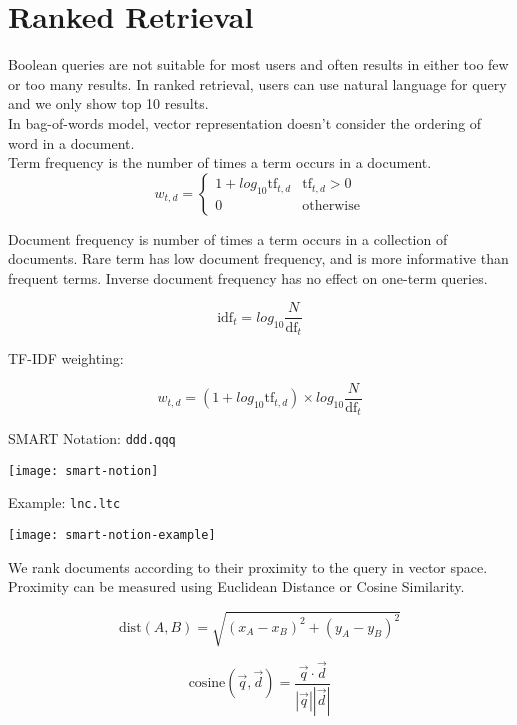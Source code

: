 \chapter{Ranked Retrieval}
\begin{multicols*}{2}

\noindent Boolean queries are not suitable for most users and often results in either too few or too many results. In ranked retrieval, users can use natural language for query and we only show top 10 results. \\

\noindent In bag-of-words model, vector representation doesn’t consider the ordering of word in a document.\\

\noindent Term frequency is the number of times a term occurs in a document. \\

$$w_{t,d} = 
\begin{cases}
    1 + log_{10} \text{tf}_{t,d} & \text{tf}_{t,d} > 0 \\
    0 & \text{otherwise}
\end{cases}
$$

\noindent Document frequency is number of times a term occurs in a collection of documents. Rare term has low document frequency, and is more informative than frequent terms. Inverse document frequency has no effect on one-term queries.

$$\text{idf}_t = log_{10} \frac{N}{\text{df}_t}$$

\noindent TF-IDF weighting: 

$$w_{t,d} = (1+ log_{10} \text{tf}_{t,d})\times log_{10} \frac{N}{\text{df}_t}$$

\noindent SMART Notation: \verb|ddd.qqq|
\begin{center}
\texttt{[image: smart-notion]}
\end{center}

\noindent Example: \verb|lnc.ltc|
\begin{center}
\texttt{[image: smart-notion-example]}
\end{center}

\noindent We rank documents according to their proximity to the query in vector space. Proximity can be measured using Euclidean Distance or Cosine Similarity.

$$\text{dist}(A,B) = \sqrt{(x_A - x_B)^2 + (y_A - y_B)^2}$$

$$\text{cosine} (\vec{q},\vec{d}) = \frac{\vec{q} \cdot \vec{d}}{|\vec{q}||\vec{d}|}$$

\end{multicols*}
